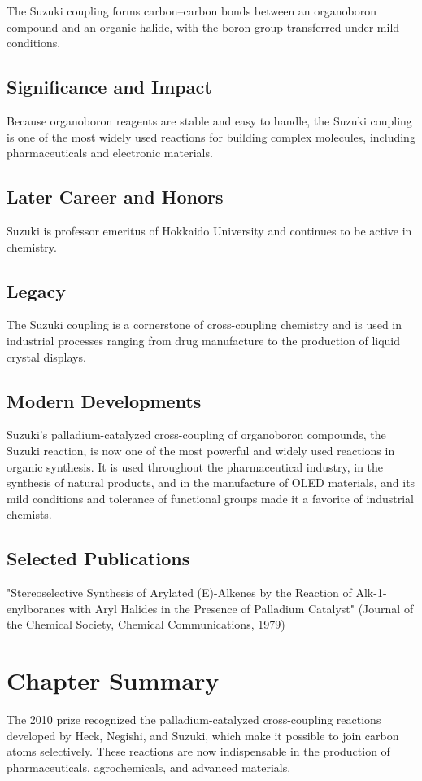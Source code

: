 The Suzuki coupling forms carbon--carbon bonds between an organoboron compound and an organic halide, with the boron group transferred under mild conditions.

\subsection*{Significance and Impact}

Because organoboron reagents are stable and easy to handle, the Suzuki coupling is one of the most widely used reactions for building complex molecules, including pharmaceuticals and electronic materials.

\subsection*{Later Career and Honors}

Suzuki is professor emeritus of Hokkaido University and continues to be active in chemistry.

\subsection*{Legacy}

The Suzuki coupling is a cornerstone of cross-coupling chemistry and is used in industrial processes ranging from drug manufacture to the production of liquid crystal displays.

\subsection*{Modern Developments}

Suzuki's palladium-catalyzed cross-coupling of organoboron compounds, the Suzuki reaction, is now one of the most powerful and widely used reactions in organic synthesis. It is used throughout the pharmaceutical industry, in the synthesis of natural products, and in the manufacture of OLED materials, and its mild conditions and tolerance of functional groups made it a favorite of industrial chemists.

\subsection*{Selected Publications}

"Stereoselective Synthesis of Arylated (E)-Alkenes by the Reaction of Alk-1-enylboranes with Aryl Halides in the Presence of Palladium Catalyst" (Journal of the Chemical Society, Chemical Communications, 1979)

\clearpage

\section*{Chapter Summary}

The 2010 prize recognized the palladium-catalyzed cross-coupling reactions developed by Heck, Negishi, and Suzuki, which make it possible to join carbon atoms selectively. These reactions are now indispensable in the production of pharmaceuticals, agrochemicals, and advanced materials.
